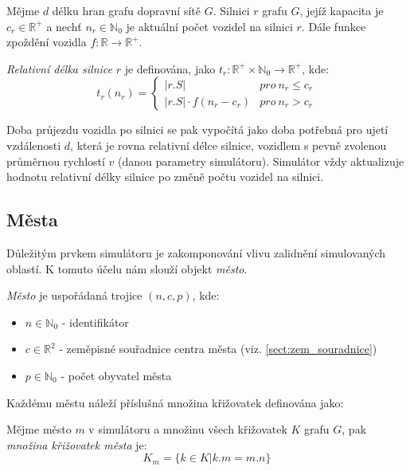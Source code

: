 \begin{defn}\label{def:relativni_delka_silnice}
    Mějme $d$ délku hran grafu dopravní sítě $G$. Silnici $r$ grafu $G$,
    jejíž kapacita je $c_r \in \mathbb{R}^+$ a 
    nechť $n_r \in \mathbb{N}_0$ je aktuální počet vozidel na 
    silnici $r$. Dále funkce zpoždění vozidla $f:\mathbb{R} \to \mathbb{R}^+$.

    \emph{Relativní délka silnice} $r$ je definována, jako 
    $t_r:\mathbb{R}^+ \times \mathbb{N}_0 \to \mathbb{R}^+$, kde:
    $$
        t_{r}(n_r) =
          \begin{cases}
            |r.S| & pro\ n_r \leq c_r \\
            |r.S| \cdot f(n_r - c_r) & pro\ n_r > c_r
          \end{cases}       
    $$
\end{defn}

Doba průjezdu vozidla po silnici se pak vypočítá jako doba potřebná pro ujetí
vzdálenosti $d$, která je rovna relativní délce silnice, vozidlem s pevně
zvolenou průměrnou rychlostí $v$ (danou parametry simulátoru). Simulátor 
vždy aktualizuje hodnotu relativní délky silnice po změně počtu vozidel 
na silnici.


\subsection{Města}
Důležitým prvkem simulátoru je zakomponování vlivu zalidnění simulovaných oblastí.
K tomuto účelu nám slouží objekt \emph{město}.

\begin{defn}[Město]\label{def:mesto}
    \emph{Město} je uspořádaná trojice $(n, c, p)$, kde:
    \begin{itemize}
        \item $n \in \mathbb{N}_0$ - identifikátor
        \item $c \in \mathbb{R}^2$ - zeměpisné souřadnice centra města 
        (viz. \cref{sect:zem_souradnice})
        \item $p \in \mathbb{N}_0$ - počet obyvatel města
    \end{itemize}
\end{defn}

Každému městu náleží příslušná množina křižovatek definována jako:

\begin{defn}\label{def:krizovatky_mesta}
    Mějme město $m$ v simulátoru a množinu všech křižovatek $K$ grafu $G$,
    pak \emph{množina křižovatek města} je:
    $$K_m = \{k \in K| k.m = m.n\}$$ 
\end{defn}

